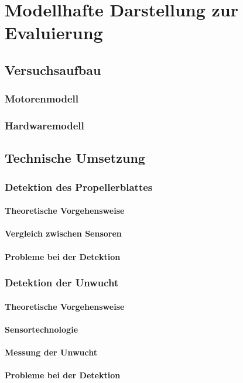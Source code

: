 
\chapter{Modellhafte Darstellung zur Evaluierung}

\section{Versuchsaufbau}

\subsection{Motorenmodell}

\subsection{Hardwaremodell}

\section{Technische Umsetzung}

\subsection{Detektion des Propellerblattes}

\subsubsection*{Theoretische Vorgehensweise}

\subsubsection*{Vergleich zwischen Sensoren}

\subsubsection*{Probleme bei der Detektion}

\subsection{Detektion der Unwucht}

\subsubsection*{Theoretische Vorgehensweise}

\subsubsection*{Sensortechnologie}

\subsubsection*{Messung der Unwucht}

\subsubsection*{Probleme bei der Detektion}
